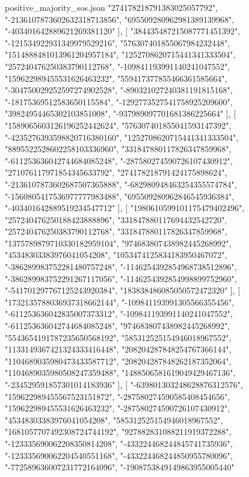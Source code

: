 \begin{filecontents*}[overwrite]{positive_majority_sos.json}
    "274178218791383025057792",
    "-2136107873602632318713856",
    "695509280962981389139968",
    "-403401642889621269381120"
   ],
   [
    "384435487215087771451392",
    "-121534922931349979529216",
    "576307401855067984232448",
    "1514888481013961204957184",
    "1252708620715441341333504",
    "257240476250383790112768",
    "-109841193991140241047552",
    "159622989455531626463232",
    "559417377855466361585664",
    "-304750029252597274902528",
    "-890321027240381191815168",
    "-18175369512583650115584",
    "-1292773527541758925209600",
    "39824954465302103851008",
    "-937989097701681386225664"
   ],
   [
    "1589065603126196252442624",
    "576307401855041593147392",
    "-4235276393598820716380160",
    "1252708620715441341333504",
    "8895522528602258103336960",
    "331847880117826347859968",
    "-611253636042744684085248",
    "-287580274590726107430912",
    "271076117971854345633792",
    "274178218791424175898624",
    "-2136107873602687507365888",
    "-682980948463254355574784",
    "-1560805417536977777983488",
    "695509280962846545936384",
    "-403401642889519234547712"
   ],
   [
    "1980610599101175479402496",
    "257240476250188423888896",
    "331847880117694432542720",
    "257240476250383790112768",
    "331847880117826347859968",
    "1375789879710330182959104",
    "974683807438982445268992",
    "45348303383976041054208",
    "1053474125834183950467072",
    "-386289983752281480757248",
    "-1146254392854968738512896",
    "-386289983752291267117056",
    "-1146254392854998899752960",
    "-541701297767125243920384",
    "183838486085050572472320"
   ],
   [
    "1732135788036937318662144",
    "-109841193991305566355456",
    "-611253636042835007373312",
    "-109841193991140241047552",
    "-611253636042744684085248",
    "974683807438982445268992",
    "5543654191787235650568192",
    "585312525154946018967552",
    "1133149367421324333416448",
    "208204287848254767366144",
    "1104689035980473433587712",
    "208204287848262187352064",
    "1104689035980508247359488",
    "1488506581619049429467136",
    "-234529591857301014183936"
   ],
   [
    "-639801303248628876312576",
    "159622989455567523151872",
    "-287580274590585408454656",
    "159622989455531626463232",
    "-287580274590726107430912",
    "45348303383976041054208",
    "585312525154946018967552",
    "1681057707492308724744192",
    "927882831088211919372288",
    "-123335690062208350814208",
    "-433224468244845741735936",
    "-123335690062204540551168",
    "-433224468244850955780096",
    "-772589636007231772164096",
    "-1908753849149863955005440"

\end{filecontents*}
